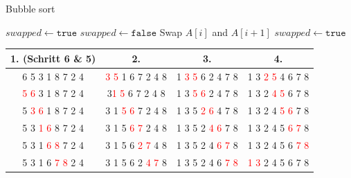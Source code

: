 \documentclass[a4paper]{article}
\begin{document}
\begin{algorithm}
    \caption{Bubble sort}
    \label{alg:BubbleSort}
    \begin{algorithmic} 
        \State $swapped \gets \texttt{true}$
        \State $swapped \gets \texttt{false}$
        \State Swap $A\left[i\right]$ and $A\left[i+1\right]$
        \State $swapped \gets \texttt{true}$
        \EndIf
        \EndFor
        \EndWhile
    \end{algorithmic}
\end{algorithm}
    \begin{table}[h]
        \centering
        \begin{tabular}{c|c|c|c}
            \textbf{1. (Schritt 6 \& 5)}    & 
            \textbf{2.}    & 
            \textbf{3.}    &
            \textbf{4.}   \\
            
            \hline
            6 5 3 1 8 7 2 4 & 
            \textcolor{red}{3 5} 1 6 7 2 4 8  &
            1 \textcolor{red}{3 5} 6 2 4 7 8 & 
            1 3 \textcolor{red}{2 5} 4 6 7 8 \\
            
            \textcolor{red}  {5 6} 3 1 8 7 2 4 &
            3\textcolor{red} {1 5} 6 7 2 4 8 &
            1 3 \textcolor{red}{5 6} 2 4 7 8 & 
            1 3 2 \textcolor{red}{4 5} 6 7 8 \\
            
            5 \textcolor{red}{3 6} 1 8 7 2 4 &
            3 1 \textcolor{red}{5 6} 7 2 4 8 &
            1 3 5 \textcolor{red}{2 6} 4 7 8 &
            1 3 2 4 \textcolor{red}{5 6} 7 8 \\

            5 3 \textcolor{red}{1 6} 8 7 2 4 & 
            3 1 5 \textcolor{red}{6 7} 2 4 8 &
            1 3 5 2 \textcolor{red}{4 6} 7 8 &
            1 3 2 4 5 \textcolor{red}{6 7} 8 \\

            5 3 1 \textcolor{red}{6 8} 7 2 4 &
            3 1 5 6 \textcolor{red}{2 7} 4 8 &
            1 3 5 2 4 \textcolor{red}{6 7} 8 &
            1 3 2 4 5 6 \textcolor{red}{7 8} \\

            5 3 1 6 \textcolor{red}{7 8} 2 4 &
            3 1 5 6 2 \textcolor{red}{4 7} 8 &
            1 3 5 2 4 6 \textcolor{red}{7 8} &
            \textcolor{red}{1 3} 2 4 5 6 7 8\\


\end{tabular}
\end{table}
\end{document}
